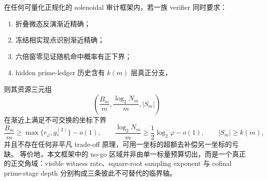 \begin{conjecture}[三坐标预算正交性]\label{conj:conclusion-solenoidal-rh-three-coordinate-budget-orthogonality}
在任何可量化正规化的 solenoidal 审计框架内，若一族 verifier 同时要求：
\begin{enumerate}
  \item 折叠微态反演渐近精确；
  \item 冻结相实现点识别渐近精确；
  \item 六倍窗零见证随机命中概率有正下界；
  \item hidden prime-ledger 历史含有 \(k(m)\) 层真正分支，
\end{enumerate}
则其资源三元组
\[
\left(
\frac{B_m}{m},
\frac{\log_2 N_m}{m},
|S_m|
\right)
\]
在渐近上满足不可交换的坐标下界
\[
\frac{B_m}{m}\ge \max\!\bigl\{r_\varphi,g_*^{(2)}\bigr\}-o(1),
\qquad
\frac{\log_2 N_m}{m}\ge \frac12\log_2\varphi-o(1),
\qquad
|S_m|\ge k(m),
\]
并且不存在任何非平凡 trade-off 原理，可用一坐标的超额去补偿另一坐标的亏缺。
等价地，本文框架中的 no-go 区域并非由单一标量预算切出，而是一个真正的正交角域：visible witness rate、square-root sampling exponent 与 cofinal prime-stage depth 分别构成三条彼此不可替代的临界轴。
\end{conjecture}
